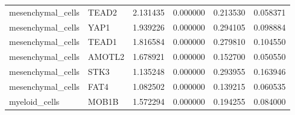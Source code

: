 \begin{longtable}{llcccc}
mesenchymal_cells & TEAD2 & 2.131435 & 0.000000 & 0.213530 & 0.058371 \\
mesenchymal_cells & YAP1 & 1.939226 & 0.000000 & 0.294105 & 0.098884 \\
mesenchymal_cells & TEAD1 & 1.816584 & 0.000000 & 0.279810 & 0.104550 \\
mesenchymal_cells & AMOTL2 & 1.678921 & 0.000000 & 0.152700 & 0.050550 \\
mesenchymal_cells & STK3 & 1.135248 & 0.000000 & 0.293955 & 0.163946 \\
mesenchymal_cells & FAT4 & 1.082502 & 0.000000 & 0.139215 & 0.060535 \\
myeloid_cells & MOB1B & 1.572294 & 0.000000 & 0.194255 & 0.084000 \\
\end{longtable}
